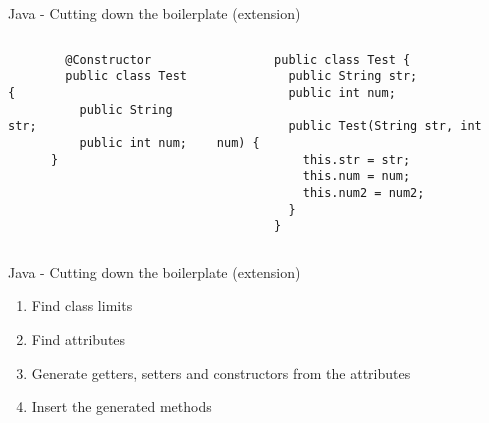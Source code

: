 \documentclass[13pt]{beamer}
\begin{document}
\begin{frame}[fragile]{Java - Cutting down the boilerplate (extension)}
  \note{
    
  }
  \begin{columns}
      \begin{verbatim}
        @Constructor
        public class Test {
          public String str;
          public int num;
      }
     \end{verbatim}
      \begin{verbatim}
        public class Test {
          public String str;
          public int num;
      
          public Test(String str, int num) {
            this.str = str;
            this.num = num;
            this.num2 = num2;
          }
        }
      \end{verbatim}
  \end{columns}

\end{frame}

\begin{frame}[fragile]{Java - Cutting down the boilerplate (extension)}
  \note{
    
  }
  
  \begin{enumerate}
    \item Find class limits
    \item Find attributes
    \item Generate getters, setters and constructors from the attributes
    \item Insert the generated methods
  \end{enumerate}
\end{frame}
\end{document}
